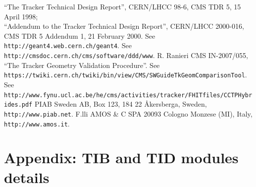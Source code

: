 \documentclass{cmspaper}
\begin{document}
\begin{thebibliography}{99}
 ``The Tracker Technical Design Report'',             CERN/LHCC 98-6, CMS TDR 5, 15 April 1998;\\
 ``Addendum to the Tracker Technical Design Report'', CERN/LHCC 2000-016, CMS TDR 5 Addendum 1, 21 February 2000.
  See {\tt http://geant4.web.cern.ch/geant4}.
  See {\tt http://cmsdoc.cern.ch/cms/software/ddd/www}.
  R. Ranieri CMS IN-2007/055, ``The Tracker Geometry Validation Procedure''.
  See {\tt https://twiki.cern.ch/twiki/bin/view/CMS/SWGuideTkGeomComparisonTool}.
 See {\tt http://www.fynu.ucl.ac.be/he/cms/activities/tracker/FHITfiles/CCTPHybrides.pdf}
  PIAB Sweden AB, Box 123, 184 22 \AA kersberga, Sweden, 
  {\tt http://www.piab.net}.
  F.lli AMOS \& C SPA 20093 Cologno Monzese (MI), Italy,
  {\tt http://www.amos.it}.
\end{thebibliography}

\appendix
\section*{Appendix: TIB and TID modules details}
\label{sec:appendix}
\pagebreak
\end{document}
